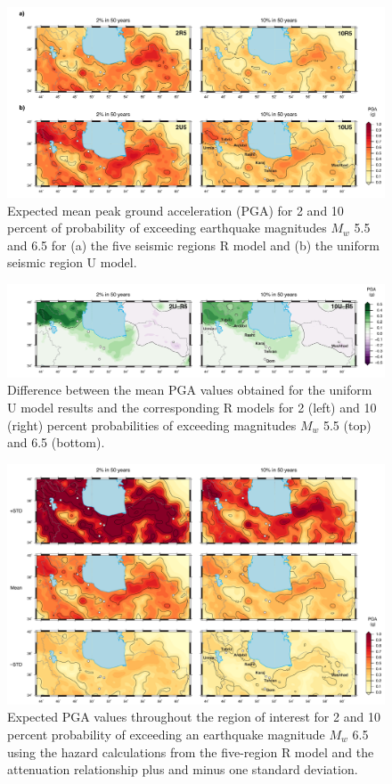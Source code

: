 \begin{figure}[t]
    \centering
    \includegraphics[width=\textwidth]{figures/pdf/figure-08.pdf} 
    \caption{Expected mean peak ground acceleration (PGA) for 2 and 10 percent of probability of exceeding earthquake magnitudes $M_w$ 5.5 and 6.5 for (a) the five seismic regions R model and (b) the uniform seismic region U model.}
    \label{fig:pga}
\end{figure}

\begin{figure}[t]
    \centering
    \includegraphics[width=\textwidth]{figures/pdf/figure-09.pdf} 
    \caption{Difference between the mean PGA values obtained for the uniform U model results and the corresponding R models for 2 (left) and 10 (right) percent probabilities of exceeding magnitudes $M_w$ 5.5 (top) and 6.5 (bottom).}
    \label{fig:pgadiff}
\end{figure}

\begin{figure}[t]
    \centering
    \includegraphics[width=\textwidth]{figures/pdf/figure-10.pdf} 
    \caption{Expected PGA values throughout the region of interest for 2 and 10 percent probability of exceeding an earthquake magnitude $M_w$ 6.5 using the hazard calculations from the five-region R model and the attenuation relationship plus and minus one standard deviation.}
    \label{fig:pgastd}
\end{figure}

